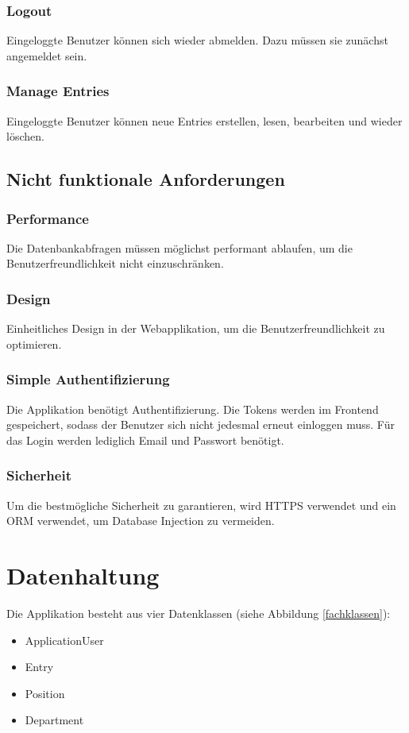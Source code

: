 \documentclass[a4paper, titlepage]{article}
\begin{document}
    \subsubsection{Logout}
    Eingeloggte Benutzer können sich wieder abmelden. Dazu müssen
    sie zunächst angemeldet sein.

    \subsubsection{Manage Entries}
    Eingeloggte Benutzer können neue Entries erstellen, lesen,
    bearbeiten und wieder löschen.

    \subsection{Nicht funktionale Anforderungen}
    \subsubsection{Performance}
    Die Datenbankabfragen müssen möglichst performant ablaufen, um die
    Benutzerfreundlichkeit nicht einzuschränken.
    \subsubsection{Design}
    Einheitliches Design in der Webapplikation, um die Benutzerfreundlichkeit zu
    optimieren.
    \subsubsection{Simple Authentifizierung}
    Die Applikation benötigt Authentifizierung. Die Tokens werden im
    Frontend gespeichert, sodass der Benutzer sich nicht jedesmal erneut
    einloggen muss. Für das Login werden lediglich Email und Passwort
    benötigt.
    \subsubsection{Sicherheit}
    Um die bestmögliche Sicherheit zu garantieren, wird HTTPS verwendet
    und ein ORM verwendet, um Database Injection zu vermeiden.

    \section{Datenhaltung}
    Die Applikation besteht aus vier Datenklassen (siehe Abbildung \ref{fachklassen}):
    \begin{itemize}
        \item ApplicationUser
        \item Entry
        \item Position
        \item Department
    \end{itemize}
\end{document}
